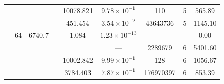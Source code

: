 \begin{table}[htbp]
\begin{tabular}{l S[table-format=3.0] S[table-format=4.1] l S[table-format=3.3] S[table-format=1.2e2] S[table-format=6.0] S[table-format=2.0] S[table-format=4.2]}
     &  &  &  & 10078.821 & $9.78 \times 10^{-1}$ & 110 & 5 & 565.89 \\
     &  &  &  & 451.454 & $3.54 \times 10^{-2}$ & 43643736 & 5 & 1145.10 \\
     & 64 & 6740.7 &  & 1.084 & $1.23 \times 10^{-13}$ & {\text{---}} & {\text{---}} & 0.00 \\
     &  &  &  & {\text{---}} & ${\text{---}}$ & 2289679 & 6 & 5401.60 \\
     &  &  &  & 10002.842 & $9.99 \times 10^{-1}$ & 128 & 6 & 1056.67 \\
     &  &  &  & 3784.403 & $7.87 \times 10^{-1}$ & 176970397 & 6 & 853.39 \\
    \bottomrule
  \end{tabular}
\end{table}
